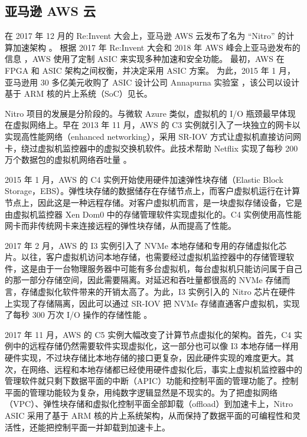 \subsection{亚马逊 AWS 云}

在 2017 年 12 月的 Re:Invent 大会上，亚马逊 AWS 云发布了名为 ``Nitro'' 的计算加速架构 \cite{nitro-blog}。
根据 2017 年 Re:Invent 大会和 2018 年 AWS 峰会上亚马逊发布的信息 \cite{nitro-talk,nitro-web}，AWS 使用了定制 ASIC 来实现多种加速和安全功能。
最初，AWS 在 FPGA 和 ASIC 架构之间权衡，并决定采用 ASIC 方案。
为此，2015 年 1 月，亚马逊用 30 多亿美元收购了 ASIC 设计公司 Annapurna 实验室 \cite{annapurna}，该公司以设计基于 ARM 核的片上系统（SoC）见长。

Nitro 项目的发展是分阶段的。与微软 Azure 类似，虚拟机的 I/O 瓶颈最早体现在虚拟网络上。早在 2013 年 11 月，AWS 的 C3 实例就引入了一块独立的网卡以实现高性能网络（enhanced networking），采用 SR-IOV 方式让虚拟机直接访问网卡，绕过虚拟机监控器中的虚拟交换机软件。此技术帮助 Netflix 实现了每秒 200 万个数据包的虚拟机网络吞吐量 \cite{netflix-aws}。

2015 年 1 月，AWS 的 C4 实例开始使用硬件加速弹性块存储（Elastic Block Storage，EBS）。弹性块存储的数据储存在存储节点上，而客户虚拟机运行在计算节点上，因此这是一种远程存储。对客户虚拟机而言，是一块虚拟存储设备，它是由虚拟机监控器 Xen Dom0 中的存储管理软件实现虚拟化的。C4 实例使用高性能网卡而非传统网卡来连接远程的弹性块存储，从而提高了性能。

2017 年 2 月，AWS 的 I3 实例引入了 NVMe 本地存储和专用的存储虚拟化芯片。以往，客户虚拟机访问本地存储，也需要经过虚拟机监控器中的存储管理软件，这是由于一台物理服务器中可能有多台虚拟机，每台虚拟机只能访问属于自己的那一部分存储空间，因此需要隔离。对延迟和吞吐量都很高的 NVMe 存储而言，存储虚拟化软件带来的开销太高了。为此，I3 实例引入的 Nitro 芯片在硬件上实现了存储隔离，因此可以通过 SR-IOV 把 NVMe 存储直通客户虚拟机，实现了每秒 300 万次 I/O 操作的存储性能 \cite{aws-local-storage}。

2017 年 11 月，AWS 的 C5 实例大幅改变了计算节点虚拟化的架构。首先，C4 实例中的远程存储仍然需要软件实现虚拟化，这一部分也可以像 I3 本地存储一样用硬件实现，不过块存储比本地存储的接口更复杂，因此硬件实现的难度更大。其次，在网络、远程和本地存储都已经使用硬件虚拟化后，事实上虚拟机监控器中的管理软件就只剩下数据平面的中断（APIC）功能和控制平面的管理功能了。控制平面的管理功能较为复杂，用纯数字逻辑显然是不现实的。为了把虚拟网络（VPC）、弹性块存储和虚拟化控制平面全部卸载（offload）到加速卡上，Nitro ASIC 采用了基于 ARM 核的片上系统架构，从而保持了数据平面的可编程性和灵活性，还能把控制平面一并卸载到加速卡上。

